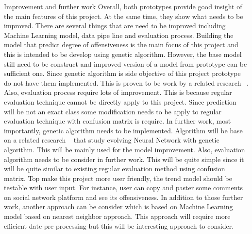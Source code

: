 \documentclass[12pt, natbib=false]{article}
\begin{document}
Improvement and further work
Overall, both prototypes provide good insight of the main features of this project. At the same time, they show what needs to be improved. There are several things that are need to be improved including Machine Learning model, data pipe line and evaluation process. Building the model that predict degree of offensiveness is the main focus of this project and this is intended to be develop using genetic algorithm. However, the base model still need to be construct and improved version of a model from prototype can be sufficient one. Since genetic algorithm is side objective of this project prototype do not have them implemented. This is proven to be work by a related research ~\cite{andersen2021evolving}. Also, evaluation process require lots of improvement. This is because regular evaluation technique cannot be directly apply to this project. Since prediction will be not an exact class some modification needs to be apply to regular evaluation technique with confusion matrix is require.
In further work, most importantly, genetic algorithm needs to be implemented. Algorithm will be base on a related research ~\cite{andersen2021evolving} that study evolving Neural Network with genetic algorithm. This will be mainly used for the model improvement. Also, evaluation algorithm needs to be consider in further work. This will be quite simple since it will be quite similar to existing regular evaluation method using confusion matrix. Top make this project more user friendly, the trend model should be testable with user input. For instance, user can copy and paster some comments on social network platform and see its offensiveness.  In addition to those further work, another approach can be consider which is based on Machine Learning model based on nearest neighbor approach. This approach will require more efficient date pre processing but this will be interesting approach to consider.


\printbibliography
\end{document}
